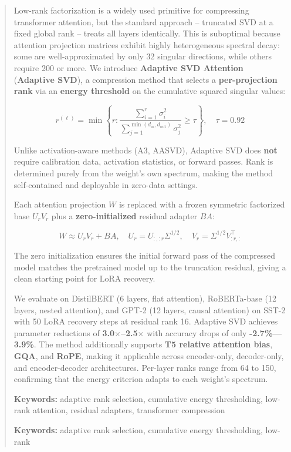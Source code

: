 \documentclass{article}
\begin{document}
\maketitle

\begin{abstract}
Low-rank factorization is a widely used primitive for compressing transformer 
attention, but the standard approach -- truncated SVD at a fixed global rank -- 
treats all layers identically. This is suboptimal because attention projection 
matrices exhibit highly heterogeneous spectral decay: some are well-approximated 
by only 32 singular directions, while others require 200 or more. We introduce 
\textbf{Adaptive SVD Attention} (\textbf{Adaptive SVD}), a compression method that selects 
a \textbf{per-projection rank} via an \textbf{energy threshold} on the cumulative squared 
singular values:

\[
r^{(\ell)} = \min\left\{ r : \frac{\sum_{i=1}^{r} \sigma_i^2}{\sum_{j=1}^{\min(d_\text{in}, d_\text{out})} \sigma_j^2} \geq \tau \right\}, \quad \tau = 0.92
\]

Unlike activation-aware methods (A3, AASVD), Adaptive SVD does \textbf{not} require 
calibration data, activation statistics, or forward passes. Rank is determined 
purely from the weight's own spectrum, making the method self-contained and 
deployable in zero-data settings.

Each attention projection $W$ is replaced with a frozen symmetric factorized 
base $U_r V_r$ plus a \textbf{zero-initialized} residual adapter $B A$:

\[
W \approx U_r V_r + B A, \quad U_r = U_{:, :r} \Sigma^{1/2}, \quad V_r = \Sigma^{1/2} V_{:r, :}^\top
\]

The zero initialization ensures the initial forward pass of the compressed model 
matches the pretrained model up to the truncation residual, giving a clean 
starting point for LoRA recovery.

We evaluate on DistilBERT (6 layers, flat attention), RoBERTa-base (12 layers, 
nested attention), and GPT-2 (12 layers, causal attention) on SST-2 with 
50 LoRA recovery steps at residual rank 16. 
Adaptive SVD achieves parameter reductions of \textbf{3.0$\times$--2.5$\times$} 
with accuracy drops of only \textbf{-2.7\%---3.9\%}. The method 
additionally supports \textbf{T5 relative attention bias}, \textbf{GQA}, and \textbf{RoPE}, 
making it applicable across encoder-only, decoder-only, and encoder-decoder 
architectures. Per-layer ranks range from 64 to 150, 
confirming that the energy criterion adapts to each weight's spectrum.

\textbf{Keywords:} adaptive rank selection, cumulative energy thresholding, low-rank 
attention, residual adapters, transformer compression



\vspace{0.5em}
\noindent\textbf{Keywords:} adaptive rank selection, cumulative energy thresholding, low-rank
\end{abstract}
\end{document}
